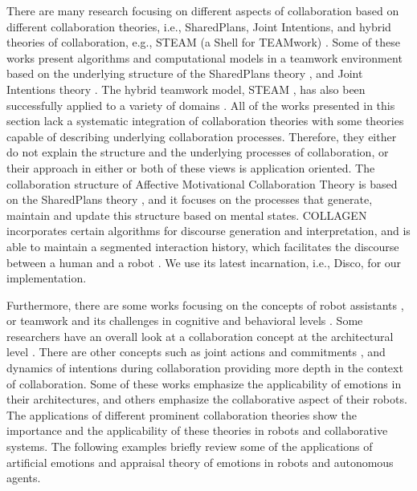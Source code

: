 There are many research focusing on different aspects of collaboration based on
different collaboration theories, i.e., SharedPlans, Joint Intentions, and
hybrid theories of collaboration, e.g., STEAM (a Shell for TEAMwork)
\cite{tambe:flexible-teamwork}. Some of these works present algorithms and
computational models in a teamwork environment based on the underlying structure
of the SharedPlans theory
\cite{lochbaum:collaborative-planning,lochbaum:plan-models,yen:cast,yin:knowledge-based-sharedplans},
and Joint Intentions theory
\cite{breazeal:humanoid-robots,mutlu:coordination-robot}. The hybrid teamwork
model, STEAM \cite{tambe:flexible-teamwork}, has also been successfully applied
to a variety of domains
\cite{kabil:coordination-mechanisms,kitano:robocup,marsella:robocup,scerri:robot-agent-person}.
All of the works presented in this section lack a systematic integration of
collaboration theories with some theories capable of describing underlying
collaboration processes. Therefore, they either do not explain the structure and
the underlying processes of collaboration, or their approach in either or both
of these views is application oriented. The collaboration structure of Affective
Motivational Collaboration Theory is based on the SharedPlans theory
\cite{grosz:planning-acting,grosz:collaboration,grosz:plans-discourse}, and it
focuses on the processes that generate, maintain and update this structure based
on mental states. COLLAGEN \cite{rich:collaboration-manager,rich:discourse} 
incorporates certain algorithms for discourse generation and interpretation, and
is able to maintain a segmented interaction history, which facilitates the
discourse between a human and a robot \cite{rickel:discourse-theory-dialogue}.
We use its latest incarnation, i.e., Disco, for our implementation.

Furthermore, there are some works focusing on the concepts of robot assistants
\cite{clancey:agent-assistants-collaboration}, or teamwork and its challenges in
cognitive and behavioral levels
\cite{nikolaidis:collaboration-joint-action,scerri:prototype-distributed-teams}.
Some researchers have an overall look at a collaboration concept at the
architectural level
\cite{esau:integrating-emotion-collaboration,garcia:collaboration-emotional-awareness,sofge:collaboration-humanoid-space}.
There are other concepts such as joint actions and commitments
\cite{grosz:intention-dynamics-collaboration}, and dynamics of intentions during
collaboration \cite{levesque:acting-together} providing more depth in the
context of collaboration. Some of these works emphasize the applicability of
emotions in their architectures, and others emphasize the collaborative aspect
of their robots. The applications of different prominent collaboration theories
show the importance and the applicability of these theories in robots and
collaborative systems. The following examples briefly review some of the
applications of artificial emotions and appraisal theory of emotions in robots
and autonomous agents.\\

